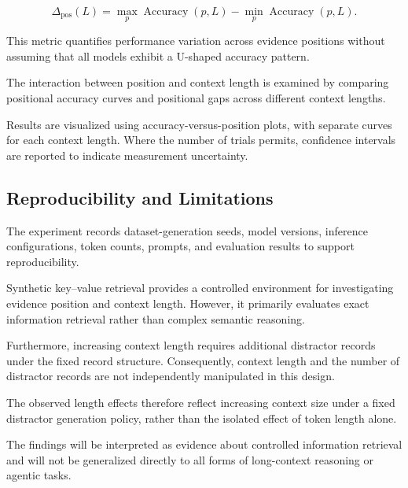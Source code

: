\begin{equation}
    \Delta_{\mathrm{pos}}(L)
    =
    \max_p \operatorname{Accuracy}(p,L)
    -
    \min_p \operatorname{Accuracy}(p,L).
    \label{eq:position-gap}
\end{equation}

This metric quantifies performance variation across
evidence positions without assuming that all models
exhibit a U-shaped accuracy pattern.

The interaction between position and context length
is examined by comparing positional accuracy curves
and positional gaps across different context lengths.

Results are visualized using accuracy-versus-position
plots, with separate curves for each context length.
Where the number of trials permits, confidence
intervals are reported to indicate measurement
uncertainty.

\subsection{Reproducibility and Limitations}
\label{subsec:limitations}

The experiment records dataset-generation seeds,
model versions, inference configurations, token counts,
prompts, and evaluation results to support reproducibility.

Synthetic key--value retrieval provides a controlled
environment for investigating evidence position and
context length. However, it primarily evaluates
exact information retrieval rather than complex
semantic reasoning.

Furthermore, increasing context length requires
additional distractor records under the fixed record
structure. Consequently, context length and the
number of distractor records are not independently
manipulated in this design.

The observed length effects therefore reflect
increasing context size under a fixed distractor
generation policy, rather than the isolated effect
of token length alone.

The findings will be interpreted as evidence about
controlled information retrieval and will not be
generalized directly to all forms of long-context
reasoning or agentic tasks.
